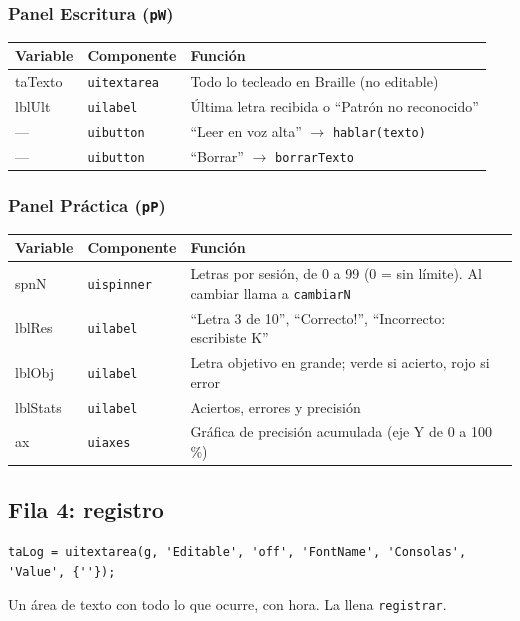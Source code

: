\documentclass[11pt,a4paper]{article}
\newcommand{\cod}[1]{\texttt{#1}}
\begin{document}
\subsubsection{Panel Escritura (\texttt{pW})}
\begin{center}
\begin{tabular}{>{\ttfamily}l l >{\raggedright\arraybackslash}p{8cm}}
\toprule
\normalfont\textbf{Variable} & \textbf{Componente} & \textbf{Función} \\
\midrule
taTexto & \cod{uitextarea} & Todo lo tecleado en Braille (no editable) \\
lblUlt & \cod{uilabel} & Última letra recibida o ``Patrón no reconocido'' \\
--- & \cod{uibutton} & ``Leer en voz alta'' $\rightarrow$ \cod{hablar(texto)} \\
--- & \cod{uibutton} & ``Borrar'' $\rightarrow$ \cod{borrarTexto} \\
\bottomrule
\end{tabular}
\end{center}

\subsubsection{Panel Práctica (\texttt{pP})}
\begin{center}
\begin{tabular}{>{\ttfamily}l l >{\raggedright\arraybackslash}p{8cm}}
\toprule
\normalfont\textbf{Variable} & \textbf{Componente} & \textbf{Función} \\
\midrule
spnN & \cod{uispinner} & Letras por sesión, de 0 a 99 (0 = sin límite). Al cambiar llama a \cod{cambiarN} \\
lblRes & \cod{uilabel} & ``Letra 3 de 10'', ``Correcto!'', ``Incorrecto: escribiste K'' \\
lblObj & \cod{uilabel} & Letra objetivo en grande; verde si acierto, rojo si error \\
lblStats & \cod{uilabel} & Aciertos, errores y precisión \\
ax & \cod{uiaxes} & Gráfica de precisión acumulada (eje Y de 0 a 100 \%) \\
\bottomrule
\end{tabular}
\end{center}

\subsection{Fila 4: registro}
\begin{lstlisting}[firstnumber=126]
    taLog = uitextarea(g, 'Editable', 'off', 'FontName', 'Consolas', 'Value', {''});
\end{lstlisting}
Un área de texto con todo lo que ocurre, con hora. La llena \cod{registrar}.
\end{document}
